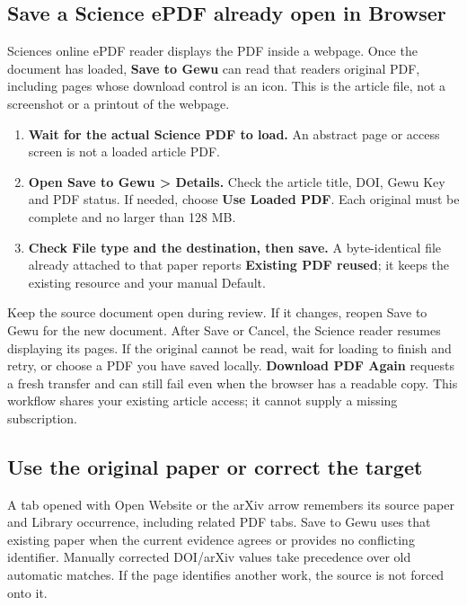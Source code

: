 \documentclass[10pt,letterpaper,oneside]{scrreprt}
\providecommand{\tightlist}{\setlength{\itemsep}{1pt}\setlength{\parskip}{0pt}}
\begin{document}
\subsection{Save a Science ePDF already open in Browser}\label{browser-science-epdf}

Science\textquotesingle s online ePDF reader displays the PDF inside a webpage. Once the document has loaded, \textbf{Save to Gewu} can read that reader\textquotesingle s original PDF, including pages whose download control is an icon. This is the article file, not a screenshot or a printout of the webpage.

\begin{enumerate}
\tightlist
\item
  \textbf{Wait for the actual Science PDF to load.} An abstract page or access screen is not a loaded article PDF.
\item
  \textbf{Open \textbf{Save to Gewu \textgreater{} Details}.} Check the article title, DOI, Gewu Key and PDF status. If needed, choose \textbf{Use Loaded PDF}. Each original must be complete and no larger than 128 MB.
\item
  \textbf{Check File type and the destination, then save.} A byte-identical file already attached to that paper reports \textbf{Existing PDF reused}; it keeps the existing resource and your manual Default.
\end{enumerate}

Keep the source document open during review. If it changes, reopen Save to Gewu for the new document. After Save or Cancel, the Science reader resumes displaying its pages. If the original cannot be read, wait for loading to finish and retry, or choose a PDF you have saved locally. \textbf{Download PDF Again} requests a fresh transfer and can still fail even when the browser has a readable copy. This workflow shares your existing article access; it cannot supply a missing subscription.

\subsection{Use the original paper or correct the target}\label{use-the-original-paper-or-correct-the-target}

A tab opened with Open Website or the arXiv arrow remembers its source paper and Library occurrence, including related PDF tabs. Save to Gewu uses that existing paper when the current evidence agrees or provides no conflicting identifier. Manually corrected DOI/arXiv values take precedence over old automatic matches. If the page identifies another work, the source is not forced onto it.
\end{document}
